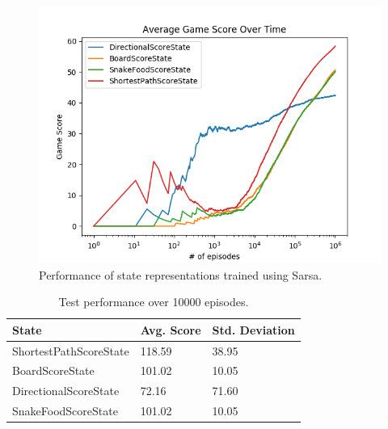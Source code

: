 \documentclass[result.tex]{subfiles}
\begin{document}
    \begin{figure}[ht]
        \centering
        \includegraphics[width=\linewidth]{../images/sarsa/state/42/state_sarsa_average_game_score_over_time.png}
        \caption{Performance of state representations trained using Sarsa.}
        \label{fig:state_sarsa}
    \end{figure}

    \begin{table}[ht]
        \centering
        \begin{tabular}{ | l | l | l | }
            \hline
            State & Avg. Score & Std. Deviation \\ \hline
            ShortestPathScoreState & 118.59 & 38.95 \\ \hline
            BoardScoreState & 101.02 & 10.05 \\ \hline
            DirectionalScoreState & 72.16 & 71.60 \\ \hline
            SnakeFoodScoreState & 101.02 & 10.05 \\
            \hline
        \end{tabular}
        \caption{Test performance over 10000 episodes.}
        \label{table:state_sarsa}
    \end{table}
\end{document}
